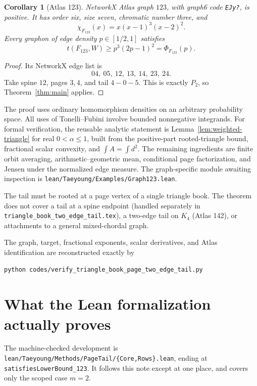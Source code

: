\documentclass[11pt]{article}
\newtheorem{corollary}[theorem]{Corollary}
\begin{document}
\begin{corollary}[Atlas 123]
NetworkX Atlas graph $123$, with graph6 code \texttt{EJy?}, is positive.
It has order six, size seven, chromatic number three, and
\[
 \chi_{F_{123}}(x)=x(x-1)^3(x-2)^2.
\]
Every graphon of edge density $p\in[1/2,1]$ satisfies
\[
 t(F_{123},W)\geq p^3(2p-1)^2=\Phi_{F_{123}}(p).
\]
\end{corollary}

\begin{proof}
Its NetworkX edge list is
\[
 04,\ 05,\ 12,\ 13,\ 14,\ 23,\ 24.
\]
Take spine $12$, pages $3,4$, and tail $4-0-5$.  This is exactly $P_2$,
so Theorem~\ref{thm:main} applies.
\end{proof}

The proof uses ordinary homomorphism densities on an arbitrary probability
space.  All uses of Tonelli--Fubini involve bounded nonnegative integrands.
For formal verification, the reusable analytic statement is
Lemma~\ref{lem:weighted-triangle} for real $0<\alpha\leq1$, built from the
positive-part rooted-triangle bound, fractional scalar convexity, and
$\int A=\int d^2$.  The remaining ingredients are finite orbit averaging,
arithmetic--geometric mean, conditional page factorization, and Jensen under
the normalized edge measure.  The graph-specific module awaiting inspection
is \texttt{lean/Taeyoung/Examples/Graph123.lean}.

The tail must be rooted at a page vertex of a single triangle book.  The
theorem does not cover a tail at a spine endpoint (handled separately in
\texttt{triangle\_book\_two\_edge\_tail.tex}), a two-edge tail on $K_4$
(Atlas 142), or attachments to a general mixed-chordal graph.

The graph, target, fractional exponents, scalar derivatives, and Atlas
identification are reconstructed exactly by
\begin{verbatim}
python codes/verify_triangle_book_page_two_edge_tail.py
\end{verbatim}


\section{What the Lean formalization actually proves}

The machine-checked development is
\texttt{lean/Taeyoung/Methods/PageTail/\{Core,Rows\}.lean}, ending at
\texttt{satisfiesLowerBound\_123}.  It follows this note except at one place,
and covers only the scoped case $m=2$.
\end{document}
